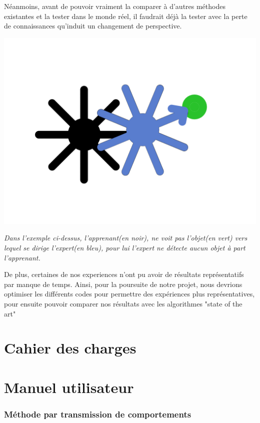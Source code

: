 \documentclass[a4paper, 12pt]{report}
\begin{document}
Néanmoins, avant de pouvoir vraiment la comparer à d'autres méthodes existantes et la tester dans le monde réel, il faudrait déjà la tester avec la perte de connaissances qu'induit un changement de perspective.
\begin{center}
	\includegraphics[scale = 0.5]{scheme.png}
\end{center}
\textit{Dans l'exemple ci-dessus, l'apprenant(en noir), ne voit pas l'objet(en vert) vers lequel se dirige l'expert(en bleu), pour lui l'expert ne détecte aucun objet à part l'apprenant.}

De plus, certaines de nos experiences n'ont pu avoir de résultats représentatifs par manque de temps. Ainsi, pour la poursuite de notre projet, nous devrions optimiser les différents codes pour permettre des expériences plus représentatives, pour ensuite pouvoir comparer nos résultats avec les algorithmes "state of the art"


    \appendix

    \chapter{Cahier des charges}

    \chapter{Manuel utilisateur}
     
     
    \subsection{Méthode par transmission de comportements}
    
\end{document}
